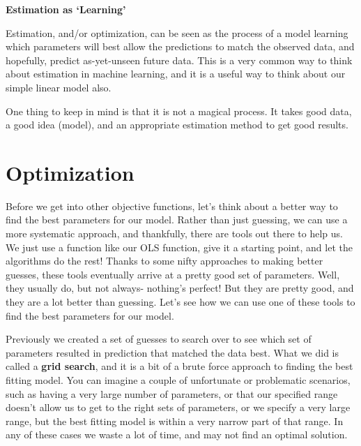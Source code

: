 \documentclass[
  letterpaper,
]{krantz}
\begin{document}
\begin{tcolorbox}[enhanced jigsaw, toprule=.15mm, colback=white, breakable, arc=.35mm, rightrule=.15mm, opacityback=0, bottomrule=.15mm, leftrule=.75mm, left=2mm]

\textbf{Estimation as `Learning'}\vspace{2mm}

Estimation, and/or optimization, can be seen as the process of a model
learning which parameters will best allow the predictions to match the
observed data, and hopefully, predict as-yet-unseen future data. This is
a very common way to think about estimation in machine learning, and it
is a useful way to think about our simple linear model also.

One thing to keep in mind is that it is not a magical process. It takes
good data, a good idea (model), and an appropriate estimation method to
get good results.

\end{tcolorbox}

\section{Optimization}\label{sec-estim-opt}

Before we get into other objective functions, let's think about a better
way to find the best parameters for our model. Rather than just
guessing, we can use a more systematic approach, and thankfully, there
are tools out there to help us. We just use a function like our OLS
function, give it a starting point, and let the algorithms do the rest!
Thanks to some nifty approaches to making better guesses, these tools
eventually arrive at a pretty good set of parameters. Well, they usually
do, but not always- nothing's perfect! But they are pretty good, and
they are a lot better than guessing. Let's see how we can use one of
these tools to find the best parameters for our model.

Previously we created a set of guesses to search over to see which set
of parameters resulted in prediction that matched the data best. What we
did is called a \textbf{grid search}, and it is a bit of a brute force
approach to finding the best fitting model. You can imagine a couple of
unfortunate or problematic scenarios, such as having a very large number
of parameters, or that our specified range doesn't allow us to get to
the right sets of parameters, or we specify a very large range, but the
best fitting model is within a very narrow part of that range. In any of
these cases we waste a lot of time, and may not find an optimal
solution.
\end{document}
